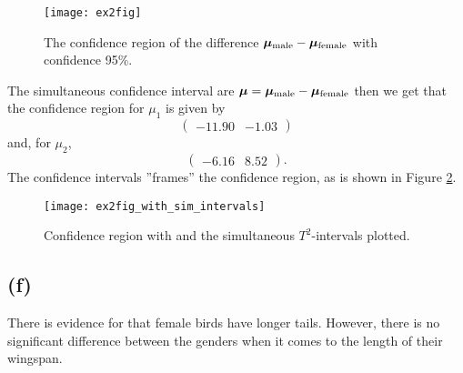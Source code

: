 \begin{figure}[h]
  \centering
  \texttt{[image: ex2fig]}
  \caption{The confidence region of the difference
    $\bm{\mu}_{\rm male} - \bm{\mu}_{\rm female}$ with confidence 95\%. }
  \label{fig:ex2fig}
\end{figure}
The simultaneous confidence interval are $\bm{\mu} = \bm{\mu}_{\rm male}- \bm{\mu}_{\rm female}$ then we get that the confidence region for $\mu_{1}$
is given by 
\begin{equation*}
  \begin{pmatrix}
   -11.90 &-1.03  
  \end{pmatrix}
\end{equation*}
and, for $\mu_{2}$, 
\begin{equation*}
  \begin{pmatrix}
   -6.16 &8.52  
  \end{pmatrix}.
\end{equation*}
The confidence intervals ''frames'' the confidence region, as is shown
in Figure \ref{fig:ex2_sim_intervals}. 
\begin{figure}[h]
  \centering
  \texttt{[image: ex2fig\_with\_sim\_intervals]}
  \caption{Confidence region with and the simultaneous $T^{2}$-intervals plotted. }
  \label{fig:ex2_sim_intervals}
\end{figure}
\subsection*{(f)}
\label{sec:f}
There is evidence for that female birds have longer tails. However,
there is no significant difference between the genders when it comes to
the length of their wingspan. 


